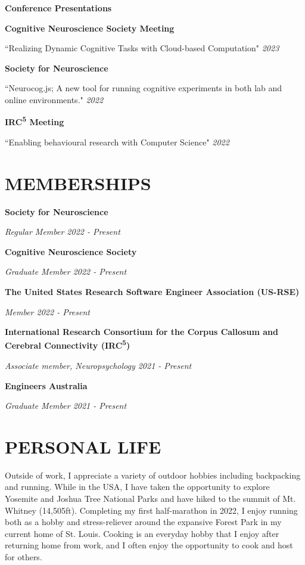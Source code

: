 \documentclass{article}
\begin{document}
  \medbreak

  {\large\textbf{Conference Presentations}}

  \textbf{Cognitive Neuroscience Society Meeting}

  ``Realizing Dynamic Cognitive Tasks with Cloud-based Computation" \hfill \textit{2023}

  \medbreak

  \textbf{Society for Neuroscience}

  ``Neurocog.js; A new tool for running cognitive experiments in both lab and online environments." \hfill \textit{2022}

  \medbreak

  \textbf{IRC\textsuperscript{5} Meeting}

  ``Enabling behavioural research with Computer Science" \hfill \textit{2022}

  \pagebreak

  \section*{\centering\uppercase{Memberships}}

  {\textbf{Society for Neuroscience}}

  \textit{Regular Member \hfill 2022 - Present}

  \medbreak

  {\textbf{Cognitive Neuroscience Society}}

  \textit{Graduate Member \hfill 2022 - Present}

  \medbreak

  {\textbf{The United States Research Software Engineer Association (US-RSE)}}

  \textit{Member \hfill 2022 - Present}

  \medbreak

  {\textbf{International Research Consortium for the Corpus Callosum and Cerebral Connectivity (IRC\textsuperscript{5})}}

  \textit{Associate member, Neuropsychology \hfill 2021 - Present}

  \medbreak

  {\textbf{Engineers Australia}}

  \textit{Graduate Member \hfill 2021 - Present}

  \section*{\centering\uppercase{Personal Life}}

  Outside of work, I appreciate a variety of outdoor hobbies including backpacking and running. While in the USA, I have taken the opportunity to explore Yosemite and Joshua Tree National Parks and have hiked to the summit of Mt. Whitney (14,505ft). Completing my first half-marathon in 2022, I enjoy running both as a hobby and stress-reliever around the expansive Forest Park in my current home of St. Louis. Cooking is an everyday hobby that I enjoy after returning home from work, and I often enjoy the opportunity to cook and host for others.
\end{document}
